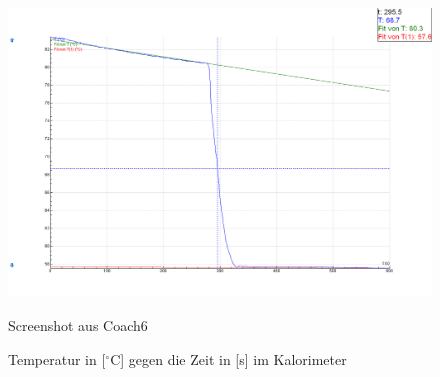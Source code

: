 \documentclass[12pt,a4paper]{article}
\begin{document}
\begin{figure}[H]
	\centering
	\includegraphics[scale=0.35]{./figure/PW4_graph.PNG}
	\caption{Temperatur in [$^\circ$C] gegen die Zeit in [s] im Kalorimeter\ }
	{\centering Screenshot aus Coach6}
	\label{fig:Tempverlauf-Eis}
\end{figure}
\noindent
\end{document}
